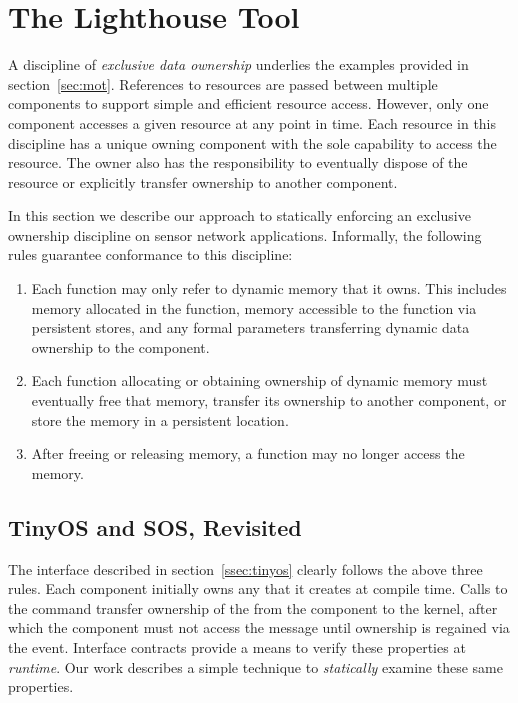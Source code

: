 \section{The Lighthouse Tool}
\label{sec:alg}



A discipline of {\em exclusive data ownership} underlies the examples
provided in section~\ref{sec:mot}.
%
References to resources are passed between multiple components to support
simple and efficient resource access.
%
However, only one component accesses a given resource at any point in time.
%
Each resource in this discipline has a unique owning component with the sole
capability to access the resource.
%
The owner also has the responsibility to eventually dispose of the resource or
explicitly transfer ownership to another component.



In this section we describe our approach to statically enforcing an exclusive
ownership discipline on sensor network applications.  
%
Informally, the following rules guarantee conformance to this discipline:
%
\begin{enumerate}
%
\item Each function may only refer to dynamic memory that it owns.  This
includes memory allocated in the function, memory accessible to the function
via persistent stores, and any formal parameters transferring dynamic data
ownership to the component.
%
\item Each function allocating or obtaining ownership of dynamic memory must
eventually free that memory, transfer its ownership to another component, or
store the memory in a persistent location.
%
\item After freeing or releasing memory, a function may no longer access the
memory.
%
\end{enumerate}



\subsection{TinyOS and SOS, Revisited}



The  interface described in section~\ref{ssec:tinyos} clearly
follows the above three rules.
%
Each component initially owns any  that it creates at compile
time.
%
Calls to the  command transfer ownership of the 
from the component to the kernel, after which the component must not access
the message until ownership is regained via the  event.
%
Interface contracts provide a means to verify these properties at {\em
runtime}.
%
Our work describes a simple technique to {\em statically} examine these same
properties.
 


